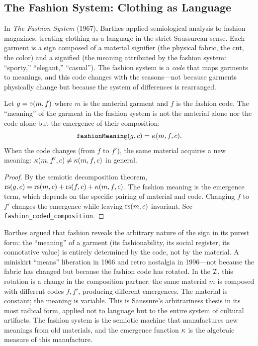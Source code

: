 \subsection{The Fashion System: Clothing as Language}

In \textit{The Fashion System} (1967), Barthes applied semiological
analysis to fashion magazines, treating clothing as a language in the
strict Saussurean sense. Each garment is a sign composed of a material
signifier (the physical fabric, the cut, the color) and a signified
(the meaning attributed by the fashion system: ``sporty,'' ``elegant,''
``casual''). The fashion system is a \emph{code} that maps garments to
meanings, and this code changes with the seasons---not because garments
physically change but because the system of differences is rearranged.

\begin{theorem}
\label{thm:fashion-composition}
Let $g = \circ(m, f)$ where $m$ is the material garment and $f$ is the fashion code. The ``meaning'' of the garment in the fashion system is not the material alone nor the code alone but the emergence of their composition:
\[
  \texttt{fashionMeaning}(g, c) = \kappa(m, f, c).
\]
When the code changes (from $f$ to $f'$), the same material acquires a new meaning: $\kappa(m, f', c) \neq \kappa(m, f, c)$ in general.
\end{theorem}

\begin{proof}
By the semiotic decomposition theorem, $\mathrm{rs}(g, c) = \mathrm{rs}(m, c) + \mathrm{rs}(f, c) + \kappa(m, f, c)$. The fashion meaning is the emergence term, which depends on the specific pairing of material and code. Changing $f$ to $f'$ changes the emergence while leaving $\mathrm{rs}(m, c)$ invariant. See \texttt{fashion\_coded\_composition}.
\end{proof}

\begin{interpretation}
Barthes argued that fashion reveals the arbitrary nature of the sign in its purest form: the ``meaning'' of a garment (its fashionability, its social register, its connotative value) is entirely determined by the code, not by the material. A miniskirt ``means'' liberation in 1966 and retro nostalgia in 1996---not because the fabric has changed but because the fashion code has rotated. In the $\mathcal{I}$, this rotation is a change in the composition partner: the same material $m$ is composed with different codes $f, f'$, producing different emergences. The material is constant; the meaning is variable. This is Saussure's arbitrariness thesis in its most radical form, applied not to language but to the entire system of cultural artifacts. The fashion system is the semiotic machine that manufactures new meanings from old materials, and the emergence function $\kappa$ is the algebraic measure of this manufacture.
\end{interpretation}

